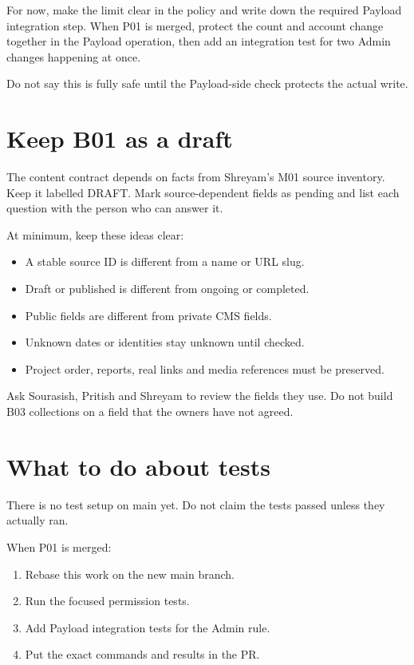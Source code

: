 \documentclass[11pt]{article}
\begin{document}
For now, make the limit clear in the policy and write down the required Payload integration step. When P01 is merged, protect the count and account change together in the Payload operation, then add an integration test for two Admin changes happening at once.

Do not say this is fully safe until the Payload-side check protects the actual write.

\section{Keep B01 as a draft}

The content contract depends on facts from Shreyam's M01 source inventory. Keep it labelled DRAFT. Mark source-dependent fields as pending and list each question with the person who can answer it.

At minimum, keep these ideas clear:

\begin{itemize}
\item A stable source ID is different from a name or URL slug.
\item Draft or published is different from ongoing or completed.
\item Public fields are different from private CMS fields.
\item Unknown dates or identities stay unknown until checked.
\item Project order, reports, real links and media references must be preserved.
\end{itemize}

Ask Sourasish, Pritish and Shreyam to review the fields they use. Do not build B03 collections on a field that the owners have not agreed.

\section{What to do about tests}

There is no test setup on main yet. Do not claim the tests passed unless they actually ran.

When P01 is merged:

\begin{enumerate}
\item Rebase this work on the new main branch.
\item Run the focused permission tests.
\item Add Payload integration tests for the Admin rule.
\item Put the exact commands and results in the PR.
\end{enumerate}
\end{document}
